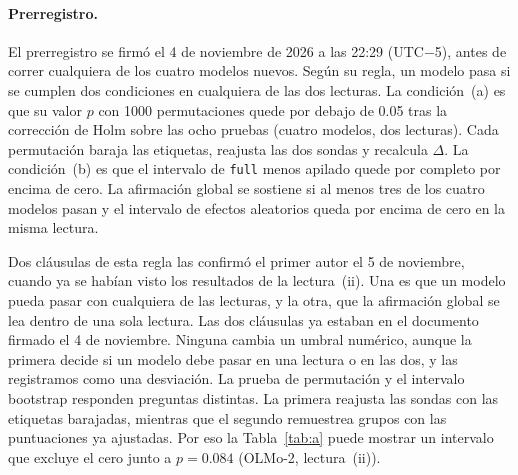\documentclass[10pt]{article}
\newcommand{\vr}[1]{\texttt{#1}}
\newcommand{\D}{\Delta}
\begin{document}
\paragraph{Prerregistro.}
El prerregistro se firmó el 4 de noviembre de 2026 a las 22:29 (UTC$-$5), antes de correr cualquiera de los cuatro
modelos nuevos. Según su regla, un modelo pasa si se cumplen dos condiciones en cualquiera de las dos lecturas. La
condición~(a) es que su valor $p$ con 1000 permutaciones quede por debajo de 0.05 tras la corrección de Holm
\citep{holm} sobre las ocho pruebas (cuatro modelos, dos lecturas). Cada permutación baraja las etiquetas, reajusta
las dos sondas y recalcula $\D$. La condición~(b) es que el intervalo de \vr{full} menos apilado quede por completo
por encima de cero. La afirmación global se sostiene si al menos tres de los cuatro modelos pasan y el intervalo de
efectos aleatorios queda por encima de cero en la misma lectura.

Dos cláusulas de esta regla las confirmó el primer autor el 5 de noviembre, cuando ya se habían visto los
resultados de la lectura~(ii). Una es que un modelo pueda pasar con cualquiera de las lecturas, y la otra, que la
afirmación global se lea dentro de una sola lectura.
Las dos cláusulas ya estaban en el documento firmado el 4 de noviembre. Ninguna cambia un umbral numérico, aunque la primera decide si
un modelo debe pasar en una lectura o en las dos, y las registramos como una desviación.
La prueba de permutación y el intervalo bootstrap responden preguntas distintas. La primera reajusta las sondas con
las etiquetas barajadas, mientras que el segundo remuestrea grupos con las puntuaciones ya ajustadas. Por eso la
Tabla~\ref{tab:a} puede mostrar un intervalo que excluye el cero junto a $p = 0.084$ (OLMo-2, lectura~(ii)).
\end{document}
